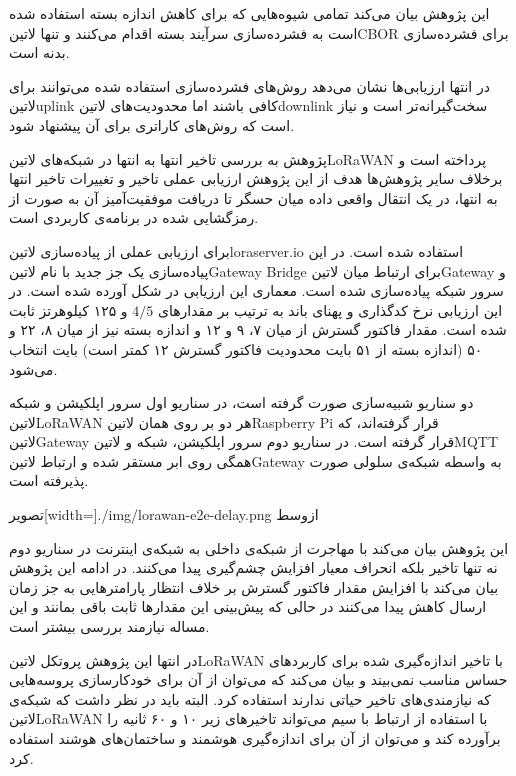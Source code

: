 این پژوهش بیان می‌کند تمامی شیوه‌هایی که برای کاهش اندازه بسته استفاده شده است به فشرده‌سازی سرآیند بسته اقدام می‌کنند
و تنها ‌لاتین{CBOR} برای فشرده‌سازی بدنه است.

در انتها ارزیابی‌ها نشان می‌دهد روش‌های فشرده‌سازی استفاده شده می‌توانند برای ‌لاتین{uplink} کافی باشند اما
محدودیت‌های ‌لاتین{downlink} سخت‌گیرانه‌تر است و نیاز است که روش‌های کاراتری برای آن پیشنهاد شود.


پژوهش  به بررسی تاخیر انتها به انتها در شبکه‌های ‌لاتین{LoRaWAN} پرداخته است و برخلاف سایر پژوهش‌ها هدف از این پژوهش
ارزیابی عملی تاخیر و تغییرات تاخیر انتها به انتها، در یک انتقال واقعی داده میان حسگر تا دریافت موفقیت‌آمیز آن به صورت از رمزگشایی شده در برنامه‌ی کاربردی است.

برای ارزیابی عملی از پیاده‌سازی ‌لاتین{loraserver.io} استفاده شده است. در این پیاده‌سازی یک جز جدید با نام ‌لاتین{Gateway Bridge}
برای ارتباط میان ‌لاتین{Gateway} و سرور شبکه پیاده‌سازی شده است. معماری این ارزیابی در شکل  آورده شده است.
در این ارزیابی نرخ کدگذاری و پهنای باند به ترتیب بر مقدارهای $4/5$ و ۱۲۵ کیلوهرتز ثابت شده است.
مقدار فاکتور گسترش از میان ۷، ۹ و ۱۲ و اندازه بسته نیز از میان ۸، ۲۲ و ۵۰ (اندازه بسته از ۵۱ بایت محدودیت فاکتور گسترش ۱۲ کمتر است) بایت انتخاب می‌شود.

دو سناریو شبیه‌سازی صورت گرفته است، در سناریو اول سرور اپلکیشن و شبکه ‌لاتین{LoRaWAN} هر دو بر روی همان ‌لاتین{Raspberry Pi}
قرار گرفته‌اند، که ‌لاتین{Gateway} قرار گرفته است. در سناریو دوم سرور اپلکیشن، شبکه و ‌لاتین{MQTT} همگی روی ابر مستقر شده و ارتباط
‌لاتین{Gateway} به واسطه شبکه‌ی سلولی صورت پذیرفته است.

‌تصویر[width=\textwidth]{./img/lorawan-e2e-delay.png}
‌ازوسط

این پژوهش بیان می‌کند با مهاجرت از شبکه‌ی داخلی به شبکه‌ی اینترنت در سناریو دوم نه تنها تاخیر بلکه انحراف معیار افزایش چشم‌گیری
پیدا می‌کنند. در ادامه این پژوهش بیان می‌کند با افزایش مقدار فاکتور گسترش بر خلاف انتظار پارامترهایی به جز زمان ارسال کاهش پیدا می‌کنند
در حالی که پیش‌بینی این مقدارها ثابت باقی بمانند و این مساله نیازمند بررسی بیشتر است.

در انتها این پژوهش پروتکل ‌لاتین{LoRaWAN} با تاخیر اندازه‌گیری شده برای کاربردهای حساس مناسب نمی‌بیند و بیان می‌کند که می‌توان از آن
برای خودکارسازی پروسه‌هایی که نیازمندی‌های تاخیر حیاتی ندارند استفاده کرد. البته باید در نظر داشت که شبکه‌ی ‌لاتین{LoRaWAN} با استفاده از
ارتباط با سیم می‌تواند تاخیرهای زیر ۱۰ و ۶۰ ثانیه را برآورده کند و می‌توان از آن برای اندازه‌گیری هوشمند و ساختمان‌های هوشند استفاده کرد.

